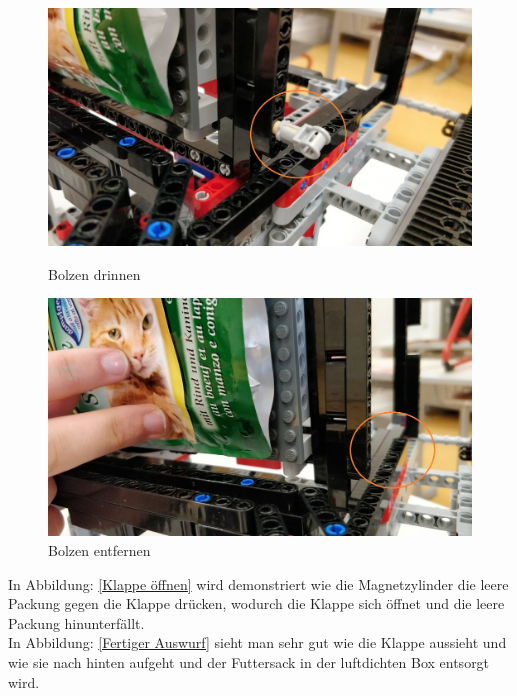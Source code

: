 \begin{figure}[H]
   \begin{minipage}[hbt]{0.5\textwidth} %
      \includegraphics[width=1\textwidth]{Bilder/Ablauf_1_png/Auswurf_2}
      \caption{Bolzen drinnen}
      \label{Bolzen drinnen}
   \end{minipage}
   \hspace{.04\linewidth}%
   \begin{minipage}[hbt]{0.5\textwidth} %
      \includegraphics[width=1\textwidth]{Bilder/Ablauf_1_png/Auswurf_3}
      \caption{Bolzen entfernen}
	  \label{Bolzen entfernen}      
      \end{minipage}
\end{figure}


In Abbildung: \ref{Klappe öffnen} wird demonstriert wie die Magnetzylinder die leere Packung gegen die Klappe drücken, wodurch die Klappe sich öffnet und die leere Packung hinunterfällt.\\

In Abbildung: \ref{Fertiger Auswurf} sieht man sehr gut wie die Klappe aussieht und wie sie nach hinten aufgeht und der Futtersack in der luftdichten Box entsorgt wird.


